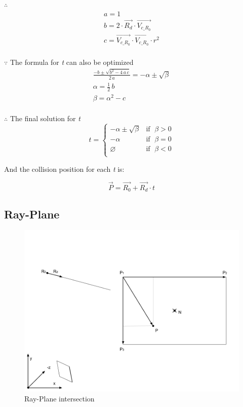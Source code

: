 $\therefore$
\[
\begin{array}{lr}
a =1\\
b = 2 \cdot \overrightarrow{R_d} \cdot \overrightarrow{V_{c\_R_0}}\\
c = \overrightarrow{V_{c\_R_0}} \cdot \overrightarrow{V_{c\_R_0}} \cdot r^2\\
\end{array}
\]

$\because$ The formula for \emph{t} can also be optimized
\[
\begin{array}{lr}
\frac{-b \pm \sqrt{b^2 - 4\,a\,c}}{2\,a} = -\alpha \pm \sqrt{\beta}\\
\alpha = \frac{1}{2}\,b\\
\beta = \alpha^2 - c\\
\end{array}
\]

$\therefore$ The final solution for \emph{t}
\[
t =
\begin{cases}
 -\alpha \pm \sqrt{\beta} & \text{if }\;\beta > 0\\
-\alpha & \text{if }\;\beta = 0\\
\varnothing & \text{if }\;\beta < 0\\
\end{cases}
\]

And the collision position for each \emph{t} is:

\[
\overrightarrow{P} = \overrightarrow{R_0} + \overrightarrow{R_d} \cdot t
\]

\subsection{Ray-Plane}

\begin{figure}[H]
\caption[ray-plane-intersection]{Ray-Plane intersection}
\label{fig:ray-plane}
\centering
\includegraphics[width=\linewidth]{Figures/ray-plane-intersection.png}
\decoRule
\end{figure}

